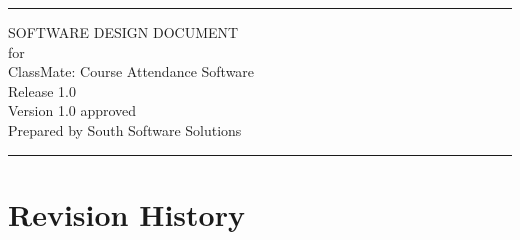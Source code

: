 \documentclass[letterpaper,12pt,oneside,listof=totoc]{scrreprt}
\date{\today}
\author{} %
\def\myversion{1.0 }
\begin{document}
\begin{titlepage}
\flushright
\rule{\textwidth}{5pt}\vskip1cm
\Huge{SOFTWARE DESIGN DOCUMENT}\\
\vspace{1.5cm}
for\\
\vspace{1.5cm}
ClassMate: Course Attendance Software\\
\vspace{1.5cm}
\LARGE{Release 1.0\\}
\vspace{1.5cm}
\LARGE{Version \myversion approved\\}
\vspace{1.5cm}
Prepared by South Software Solutions\\
\vfill
\rule{\textwidth}{5pt}
\end{titlepage}

\tableofcontents

\listoffigures

\listoftables

\chapter*{Revision History}
\end{document}

